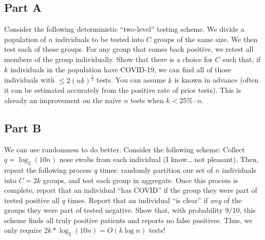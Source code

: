 \documentclass{article}
\begin{document}
\hypertarget{part-a}{%
\subsection*{Part A}\label{part-a}}

Consider the following deterministic ``two-level'' testing scheme. We divide a population of \(n\) individuals to be tested into \(C\) groups of the same size. We then test each of these groups. For any group that comes back positive, we retest all members of the group individually. Show that there is a choice for \(C\) such that, if \(k\) individuals in the population have COVID-19, we can find all of those individuals with \(\leq 2(nk)^{\frac12}\) tests. You can assume \(k\) is known in advance (often it can be estimated accurately from the positive rate of prior tests). This is already an improvement on the naive \(n\) tests when \(k < 25\% \cdot n\).

\hypertarget{part-b}{%
\subsection*{Part B}\label{part-b}}

We can use randomness to do better. Consider the following scheme: Collect \(q = \log_2 (10n)\) nose swabs from each individual (I know\ldots{} not pleasant). Then, repeat the following process \(q\) times: randomly partition our set of \(n\) individuals into \(C=2k\) groups, and test each group in aggregate. Once this process is complete, report that an individual ``has COVID'' if the group they were part of tested positive all \(q\) times. Report that an individual ``is clear'' if \emph{any} of the groups they were part of tested negative. Show that, with probability \(9/10\), this scheme finds all truly positive patients and reports no false positives. Thus, we only require \(2k * \log_2(10n) = O(k\log n)\) tests!
\end{document}
